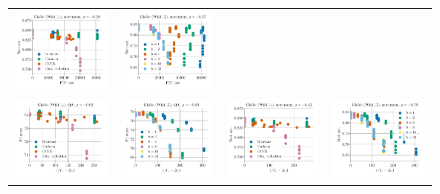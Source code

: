 \begin{figure}
\begin{tabular}{@{\hskip -0.0in}c@{\hskip -0.0in}c@{\hskip -0.0in}c@{\hskip -0.0in}c@{\hskip -0.0in}}
		\includegraphics[width=.245\linewidth]{figures/glove400k_sentiment_sst_test-acc_vs_gram-large-dim-frob-error_linx.pdf} &
		\includegraphics[width=.245\linewidth]{figures/glove-wiki400k-am_sentiment_sst_test-acc_vs_gram-large-dim-frob-error_linx.pdf} \\
		\includegraphics[width=.245\linewidth]{figures/glove400k_qa_best-f1_vs_gram-large-dim-delta1-2-trans_linx.pdf} &
		\includegraphics[width=.245\linewidth]{figures/glove-wiki400k-am_qa_best-f1_vs_gram-large-dim-delta1-2-trans_linx.pdf} &
		\includegraphics[width=.245\linewidth]{figures/glove400k_sentiment_sst_test-acc_vs_gram-large-dim-delta1-2-trans_linx.pdf} &
		\includegraphics[width=.245\linewidth]{figures/glove-wiki400k-am_sentiment_sst_test-acc_vs_gram-large-dim-delta1-2-trans_linx.pdf} \\

\end{tabular}
\end{figure}
